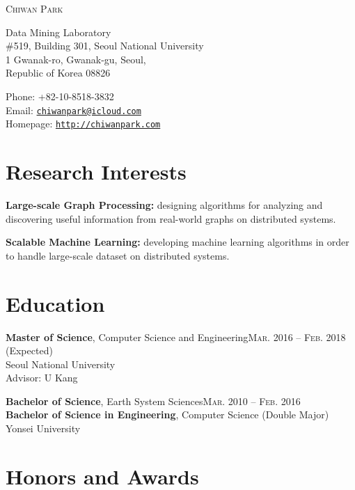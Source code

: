 \documentclass[11pt,a4paper]{article}
\makeatletter
\def\myname{Chiwan Park}
\def\myphone{+82-10-8518-3832}
\def\myaddress{Data Mining Laboratory\\
\#519, Building 301, Seoul National University\\
1 Gwanak-ro, Gwanak-gu, Seoul,\\
Republic of Korea 08826}
\def\myemail{chiwanpark@icloud.com}
\def\myhomepage{http://chiwanpark.com}
\renewenvironment{itemize}{
  \begin{list}{}{
    \setlength{\leftmargin}{1.5em}
    \setlength{\itemsep}{0.5em}
    \setlength{\parskip}{0pt}
    \setlength{\parsep}{0.25em}
  }
}{
  \end{list}
}
\makeatother
\begin{document}
\par{\Huge \textsc{\myname}}

\bigskip

\begin{minipage}[t]{0.495\textwidth}
  \myaddress
\end{minipage}
\begin{minipage}[t]{0.495\textwidth}
  Phone: \myphone \\
  Email: \href{mailto:\myemail}{\tt \myemail} \\
  Homepage: \href{\myhomepage}{\tt \myhomepage}
\end{minipage}

\section*{Research Interests}
\begin{itemize}
  \item \textbf{Large-scale Graph Processing:} designing algorithms for analyzing and discovering useful information from real-world graphs on distributed systems.
  \item \textbf{Scalable Machine Learning:} developing machine learning algorithms in order to handle large-scale dataset on distributed systems.
\end{itemize}

\section*{Education}
\begin{itemize}
  \item \textbf{Master of Science}, Computer Science and Engineering\hfill\textsc{Mar. 2016 -- Feb. 2018} (Expected)\\
        Seoul National University\\
        Advisor: U Kang
  \item \textbf{Bachelor of Science}, Earth System Sciences\hfill\textsc{Mar. 2010 -- Feb. 2016}\\
        \textbf{Bachelor of Science in Engineering}, Computer Science (Double Major)\\
        Yonsei University
\end{itemize}

\section*{Honors and Awards}
\end{document}
